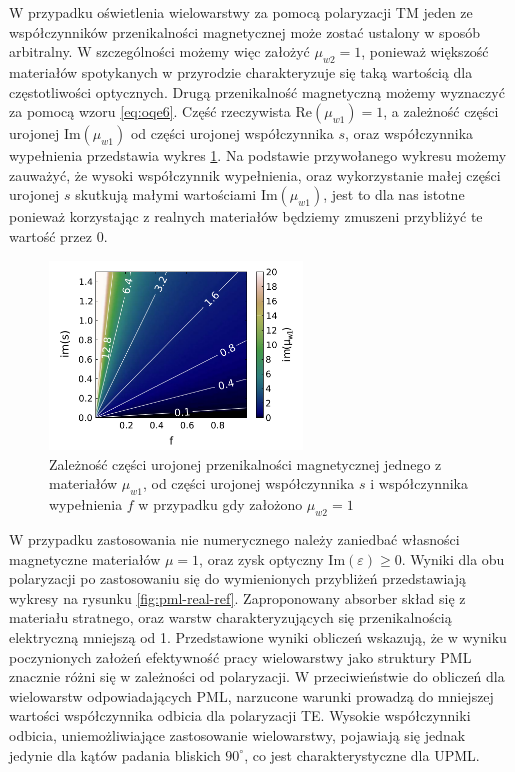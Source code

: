 W przypadku oświetlenia wielowarstwy za pomocą polaryzacji TM jeden ze współczynników przenikalności magnetycznej może zostać ustalony w sposób arbitralny. W szczególności możemy więc założyć $\mu_{w2}=1$, ponieważ większość materiałów spotykanych w przyrodzie charakteryzuje się taką wartością dla częstotliwości optycznych. Drugą przenikalność magnetyczną możemy wyznaczyć za pomocą wzoru \ref{eq:oqe6}. Część rzeczywista $\textrm{Re}(\mu_{w1})=1$, a zależność części urojonej $\textrm{Im}(\mu_{w1})$ od części urojonej współczynnika $s$, oraz współczynnika wypełnienia przedstawia wykres \ref{fig:im-mu1}. Na podstawie przywołanego wykresu możemy zauważyć, że wysoki współczynnik wypełnienia, oraz wykorzystanie małej części urojonej $s$ skutkują małymi wartościami $\textrm{Im}(\mu_{w1})$, jest to dla nas istotne ponieważ korzystając z realnych materiałów będziemy zmuszeni przybliżyć te wartość przez $0$.

\begin{figure}
	\includegraphics[width=0.6\textwidth]{images/pml/fig4.png}
	\caption{Zależność części urojonej przenikalności magnetycznej jednego z materiałów $\mu_{w1}$, od części urojonej współczynnika $s$ i współczynnika wypełnienia $f$ w przypadku gdy założono $\mu_{w2}=1$}
	\label{fig:im-mu1}
\end{figure}


W przypadku zastosowania nie numerycznego należy zaniedbać własności magnetyczne materiałów $\mu=1$, oraz zysk optyczny $\textrm{Im}(\varepsilon)\ge0$. Wyniki dla obu polaryzacji po zastosowaniu się do wymienionych przybliżeń przedstawiają wykresy na rysunku \ref{fig:pml-real-ref}. Zaproponowany absorber skład się z materiału stratnego, oraz warstw charakteryzujących się przenikalnością elektryczną mniejszą od 1. Przedstawione wyniki obliczeń wskazują, że w wyniku poczynionych założeń efektywność pracy wielowarstwy jako struktury PML znacznie różni się w zależności od polaryzacji. W przeciwieństwie do obliczeń dla wielowarstw odpowiadających PML, narzucone warunki prowadzą do mniejszej wartości współczynnika odbicia dla polaryzacji TE. Wysokie współczynniki odbicia, uniemożliwiające zastosowanie wielowarstwy,  pojawiają się jednak jedynie dla kątów padania bliskich $90^{\circ}$, co jest charakterystyczne dla UPML.

